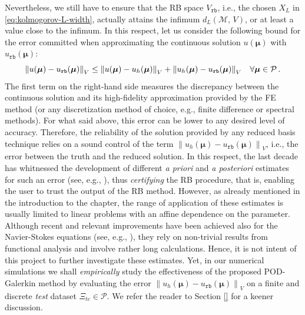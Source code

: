 \documentclass[12pt, a4paper, twoside, openright]{report}
\numberwithin{equation}{chapter}
\theoremstyle{theorem}
\theoremstyle{definition}
\theoremstyle{remark}
\theoremstyle{proposition}
\numberwithin{figure}{chapter}
\newcommand{\norm}[1]{\left\lVert#1\right\rVert}
\newcommand{\bg}[1]{\boldsymbol{#1}}
\begin{document}
		Nevertheless, we still have to ensure that the RB space $V_{\texttt{rb}}$, i.e., the chosen $X_L$ in \eqref{eq:kolmogorov-L-width}, actually attains the infimum $d_L(\mathcal{M}, \, V)$, or at least a value close to the infimum. In this respect, let us consider the following bound for the error committed when approximating the continuous solution $u(\bg{\mu})$ with $u_{\texttt{rb}}(\bg{\mu})$:
		\begin{equation*}
			\norm{u(\bg{\mu}) - u_{\texttt{rb}}(\bg{\mu})}_V \leq \norm{u(\bg{\mu}) - u_h(\bg{\mu})}_V + \norm{u_h(\bg{\mu}) - u_{\texttt{rb}}(\bg{\mu})}_V \hspace*{0.3cm} \forall \bg{\mu} \in \mathcal{P} \, .
		\end{equation*}
		The first term on the right-hand side measures the discrepancy between the continuous solution and its high-fidelity approximation provided by the FE method (or any discretization method of choice, e.g., finite difference or spectral methods). For what said above, this error can be lower to any desired level of accuracy. Therefore, the reliability of the solution provided by any reduced basis technique relies on a sound control of the term $\norm{u_h(\bg{\mu}) - u_{\texttt{rb}}(\bg{\mu})}_V$, i.e., the error between the truth and the reduced solution. In this respect, the last decade has whitnessed the development of different \emph{a priori} and \emph{a posteriori} estimates for such an error (see, e.g., \cite{Buf12, HSR16, Mad06}), thus \emph{certifying} the RB procedure, that is, enabling the user to trust the output of the RB method. However, as already mentioned in the introduction to the chapter, the range of application of these estimates is usually limited to linear problems with an affine dependence on the parameter. Although recent and relevant improvements have been achieved also for the Navier-Stokes equations (see, e.g., \cite{Dep08, QMN15}), they rely on non-trivial results from functional analysis and involve rather long calculations. Hence, it is not intent of this project to further investigate these estimates. Yet, in our numerical simulations we shall \emph{empirically} study the effectiveness of the proposed POD-Galerkin method by evaluating the error $\norm{u_h(\bg{\mu}) - u_{\texttt{rb}}(\bg{\mu})}_V$ on a finite and discrete \emph{test} dataset $\Xi_{te} \in \mathcal{P}$. We refer the reader to Section \ref{} for a keener discussion.
		
\end{document}
